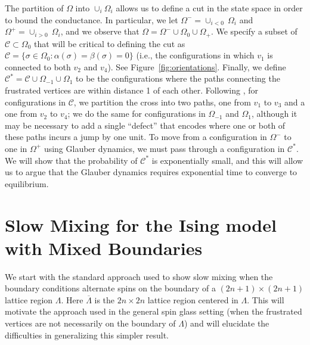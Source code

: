 \documentclass[letterpaper,english,numberwithinsect]{amsart}
\newcommand{\cC}{\mathcal{C}}
\begin{document}
The partition of $\Omega$ into $\cup_i \Omega_i$ allows us to define a cut in the state space in order to bound the conductance.
In particular, we let $\Omega^- = \cup_{i<0} \ \Omega_i$ and $\Omega^+ = \cup_{i>0} \ \Omega_i$, and we observe that $\Omega = \Omega^- \cup \Omega_0 \cup \Omega_+$.  We specify a subset of $\cC \subset \Omega_0$ that will be critical to defining the cut as $\cC =  \{\sigma \in \Omega_0: \alpha(\sigma) = \beta(\sigma) = 0\}$ (i.e., the configurations in which $v_1$ is connected to both $v_2$ and $v_4$). See Figure~\ref{fig:orientations}.  Finally, we define $\cC^* = \cC \cup \Omega_{-1} \cup \Omega_1$ to be the configurations where the paths connecting the frustrated vertices are within distance 1 of each other.   Following \cite{randall-top}, for configurations in $\cC$, we partition the cross into two paths, one from $v_1$ to $v_3$ and a one from $v_2$ to $v_4$; we do the same for configurations in $\Omega_{-1}$ and $\Omega_1$, although it may be necessary to add a single ``defect'' that encodes where one or both of these paths incurs a jump by one unit.
To move from a configuration in $\Omega^-$ to one in $\Omega^+$  using Glauber dynamics, we must pass through a configuration in $\cC^*$.
We will show that the probability of $\cC^*$ is exponentially small, and this will allow us to argue that the Glauber dynamics requires exponential time to converge to equilibrium. 




\section{Slow Mixing for the Ising model with Mixed Boundaries}\label{sec:cross}

We start with the standard approach used to show slow mixing when the boundary conditions alternate spins on the boundary of a $(2n+1) \times (2n+1)$ lattice region $\Lambda$.  
Here $\overline{\Lambda}$ is the $2n \times 2n$ lattice region centered in $\Lambda$.
This will motivate the approach used in the general spin glass setting (when the frustrated vertices are not necessarily on the boundary of $\Lambda$) and will elucidate the difficulties in generalizing this simpler result.  
\end{document}
